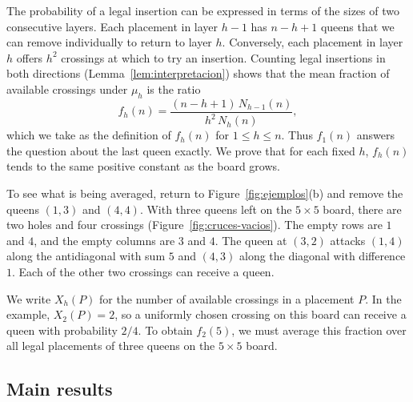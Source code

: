 The probability of a legal insertion can be expressed in terms of the sizes of two consecutive layers. Each
placement in layer $h-1$
has $n-h+1$ queens that we can remove individually to return to layer $h$. Conversely, each placement in
layer $h$ offers $h^2$
crossings at which to try an insertion. Counting legal insertions in both directions
(Lemma~\ref{lem:interpretacion}) shows that the
mean fraction of available crossings under $\mu_h$ is the ratio \begin{equation}\label{eq:fh}
 f_h(n)=\frac{(n-h+1)\,N_{h-1}(n)}{h^2\,N_h(n)} ,
\end{equation} which we take as the definition of $f_h(n)$ for $1\le h\le n$. Thus $f_1(n)$ answers the
question about the last queen
exactly. We prove that for each fixed $h$, $f_h(n)$ tends to the same positive constant as the board grows.

To see what is being averaged, return to Figure~\ref{fig:ejemplos}(b) and remove the queens $(1,3)$ and
$(4,4)$. With three queens left
on the $5\times5$ board, there are two holes and four crossings (Figure~\ref{fig:cruces-vacios}). The empty
rows are $1$ and $4$, and the empty
columns are $3$ and $4$. The queen at $(3,2)$ attacks $(1,4)$ along the antidiagonal with sum $5$ and
$(4,3)$ along the diagonal with
difference $1$. Each of the other two crossings can receive a queen.



We write $X_h(P)$ for the number of available crossings in a placement $P$. In the example, $X_2(P)=2$, so a
uniformly chosen crossing
on this board can receive a queen with probability $2/4$. To obtain $f_2(5)$, we must average this fraction
over all legal placements
of three queens on the $5\times5$ board.

\subsection{Main results}


